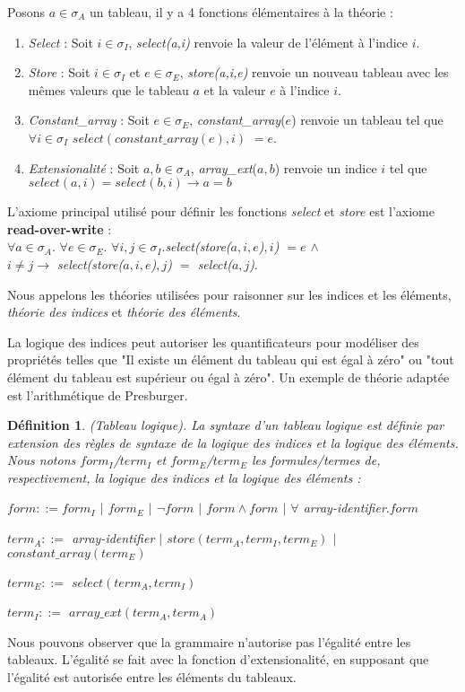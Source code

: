 \documentclass[11pt,openany]{article}
\newtheorem{definition}{D\'efinition}[subsection]
\begin{document}
	Posons $a\in \sigma_A$ un tableau, il y a 4 fonctions \'el\'ementaires \`a la th\'eorie :
	\begin{enumerate}
	\item \textit{Select} : Soit $i\in \sigma_I$, \textit{select(a,i)} renvoie la valeur de l'\'el\'ement \`a l'indice $i$.
	\item \textit{Store} :  Soit $i\in \sigma_I$ et $e\in \sigma_E$, \textit{store(a,i,e)} renvoie un nouveau tableau avec les m\^emes valeurs que le tableau $a$ et la valeur $e$ \`a l'indice $i$.
	\item \textit{Constant_array} : Soit $e\in \sigma_E$, \textit{constant\_array}($e$) renvoie un tableau tel que $\forall i\in \sigma_I$ $select(constant\_array(e),i)$ $= e$.
	\item \textit{Extensionalit\'e} : Soit $a,b\in \sigma_A$, \textit{array_ext}($a,b$) renvoie un indice $i$ tel que $select(a,i) = select(b,i)\rightarrow a = b $
	\end{enumerate}

L'axiome principal utilis\'e pour d\'efinir les fonctions \textit{select} et \textit{store} est l'axiome \textbf{read-over-write} :\\
	$\forall a\in \sigma_A.$ $\forall e\in \sigma_E.$ $\forall i,j\in \sigma_I.$\textit{select(store($a,i,e$)$,i$) $ = e$
			 $\land$ \\ $i\neq j \rightarrow$ select(store($a,i,e$)$,j$) $=$ select($a,j$)}.	
	
	Nous appelons les th\'eories utilis\'ees pour raisonner sur les indices et les \'el\'ements, \textit{th\'eorie des indices} et \textit{th\'eorie des \'el\'ements}.
	
	La logique des indices peut autoriser les quantificateurs pour mod\'eliser des propri\'et\'es telles que "Il existe un \'el\'ement du tableau qui est \'egal \`a z\'ero" ou "tout \'el\'ement du tableau est sup\'erieur ou \'egal \`a z\'ero". Un exemple de th\'eorie adapt\'ee est l'arithm\'etique de Presburger.
	
	\begin{definition}
(Tableau logique). La syntaxe d'un tableau logique est d\'efinie par extension des r\`egles de syntaxe de la logique des indices et la logique des \'el\'ements. Nous notons $form_{I}$/$term_{I}$ et $form_{E}$/$term_{E}$ les formules/termes de, respectivement, la logique des indices et la logique des \'el\'ements :\par
$form ::= form_{I}$ $|$ $form_{E}$ $|$ $\neg form$ $|$ $form\land form$ $|$ $\forall$ array-identifier$. form$\par
$term_{A} ::=$ array-identifier $|$ $store(term_{A},term_{I},term_{E})$ $|$ $constant\_array(term_{E})$\par
$term_{E} ::=$ $select(term_{A},term_{I})$\par
$term_{I} ::=$ $array\_ext(term_{A},term_{A})$

\end{definition}
	Nous pouvons observer que la grammaire n'autorise pas l'\'egalit\'e entre les tableaux. L'\'egalit\'e se fait avec la fonction d'extensionalit\'e, en supposant que l'\'egalit\'e est autoris\'ee entre les \'el\'ements du tableaux.
	
\end{document}
